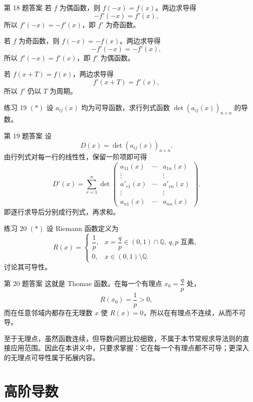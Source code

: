 ﻿\documentclass[aspectratio=169,11pt]{ctexbeamer}
\begin{document}
\begin{frame}{第 18 题答案}
\footnotesize
若 $f$ 为偶函数，则 $f(-x)=f(x)$。两边求导得
\[
-f'(-x)=f'(x),
\]
所以 $f'(-x)=-f'(x)$，即 $f'$ 为奇函数。

若 $f$ 为奇函数，则 $f(-x)=-f(x)$。两边求导得
\[
-f'(-x)=-f'(x),
\]
所以 $f'(-x)=f'(x)$，即 $f'$ 为偶函数。

若 $f(x+T)=f(x)$，两边求导得
\[
f'(x+T)=f'(x),
\]
所以 $f'$ 仍以 $T$ 为周期。
\end{frame}

\begin{frame}{练习 19}
\footnotesize
$(*)$ 设 $a_{ij}(x)$ 均为可导函数，求行列式函数 $\det(a_{ij}(x))_{n\times n}$ 的导数。
\end{frame}

\begin{frame}{第 19 题答案}
\footnotesize
设
\[
D(x)=\det(a_{ij}(x))_{n\times n}.
\]
由行列式对每一行的线性性，保留一阶项即可得
\[
D'(x)=\sum_{r=1}^n
\det\begin{pmatrix}
 a_{11}(x)&\cdots&a_{1n}(x)\\
 \vdots&&\vdots\\
 a'_{r1}(x)&\cdots&a'_{rn}(x)\\
 \vdots&&\vdots\\
 a_{n1}(x)&\cdots&a_{nn}(x)
\end{pmatrix}.
\]
即逐行求导后分别成行列式，再求和。
\end{frame}

\begin{frame}{练习 20}
\footnotesize
$(*)$ 设 Riemann 函数定义为
\[
R(x)=\begin{cases}
\dfrac1p,&x=\dfrac qp\in(0,1)\cap\mathbb Q,\ q,p\text{ 互素},\\
0,&x\in(0,1)\setminus\mathbb Q.
\end{cases}
\]
讨论其可导性。
\end{frame}

\begin{frame}[allowframebreaks]{第 20 题答案}
\footnotesize
这就是 Thomae 函数。在每一个有理点 $x_0=\dfrac{q}{p}$ 处，
\[
R(x_0)=\frac1p>0,
\]
而在任意邻域内都存在无理数 $x$ 使 $R(x)=0$，所以在有理点不连续，从而不可导。

至于无理点，虽然函数连续，但导数问题比较细致，不属于本节常规求导法则的直接应用范围。因此在本讲义中，只要求掌握：它在每一个有理点都不可导；更深入的无理点可导性属于拓展内容。
\end{frame}

\section{高阶导数}
\end{document}
